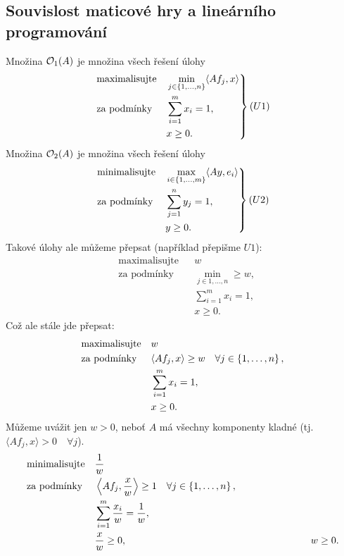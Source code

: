 \subsection{Souvislost maticové hry a lineárního programování}
Množina $\mathcal{O}_1(A)$ je množina všech řešení úlohy
\[
\left.\begin{aligned}
    &\text{maximalisujte}&& \min_{j \in \bc{1, \dots, n}} \langle A f_j, x\rangle \\
    &\text{za podmínky}  && \sum_{i=1}^{m}x_i = 1, \\
    &\phantom{\text{za podmínky}}&&x \geq 0.
\end{aligned}
\right\} (U1)
\]
Množina $\mathcal{O}_2(A)$ je množina všech řešení úlohy
\[
\left.\begin{aligned}
    &\text{minimalisujte}&& \max_{i \in \bc{1, \dots, m}} \langle A y, e_i\rangle \\
    &\text{za podmínky}  && \sum_{j=1}^{n}y_j = 1, \\
    &\phantom{\text{za podmínky}}&&y \geq 0.
\end{aligned}
\right\} (U2)
\]
Takové úlohy ale můžeme přepsat (například přepišme $U1$):
\[
\begin{aligned}
    &\text{maximalisujte}&& w \\
    &\text{za podmínky}  && \min_{j \in {1, \dots, n}} \geq w, \\
    &\phantom{\text{za podmínky}}&&\sum_{i=1}^{m} x_i = 1, \\
    &\phantom{\text{za podmínky}}&& x \geq 0.
\end{aligned}
\]
Což ale stále jde přepsat:
\[
\begin{aligned}
    &\text{maximalisujte}&& w \\
    &\text{za podmínky}  && \langle A f_j, x\rangle \geq w \quad \forall j \in \bc{1, \dots, n}, \\
    &\phantom{\text{za podmínky}}&&\sum_{i=1}^{m} x_i = 1, \\
    &\phantom{\text{za podmínky}}&& x \geq 0.
\end{aligned}
\]
Můžeme uvážit jen $w >0$, neboť $A$ má všechny komponenty kladné 
(tj. $\langle Af_j, x\rangle > 0 \quad \forall j$). 
\[
\begin{aligned}
    &\text{minimalisujte}&& \frac{1}{w} \\
    &\text{za podmínky}  && \left\langle A f_j, \frac{x}{w}\right\rangle \geq 1 \quad \forall j \in \bc{1, \dots, n}, \\
    &\phantom{\text{za podmínky}}&&\sum_{i=1}^{m} \frac{x_i}{w} = \frac{1}{w}, \\
    &\phantom{\text{za podmínky}}&& \frac{x}{w} \geq 0,
    &\phantom{\text{za podmínky}}&& w \geq 0.
\end{aligned}
\]
